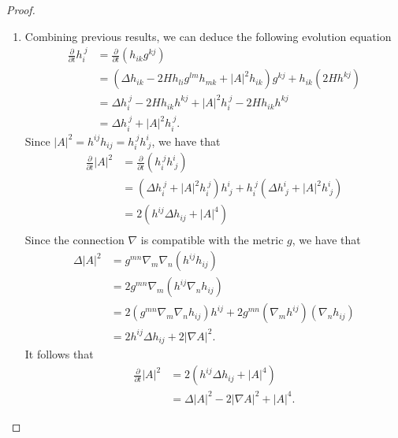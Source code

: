 \begin{proof}
\begin{enumerate}
		\item Combining previous results, we can deduce the following evolution equation \begin{equation*}
			      \begin{split}
				      \frac{\partial }{\partial t} h_{i}^{\ j}
				      &= \frac{\partial }{\partial t} (h_{ik}^{} g_{}^{kj} )\\
				      &= (\Delta h_{ik}^{} - 2 H h_{li }^{} g_{}^{lm } h_{mk}^{} + \left| A \right| ^2 h_{ik}^{})g_{}^{kj}+ h_{ik}^{} (2H h_{}^{kj} )\\
				      &= \Delta h_{i}^{\ j} - 2H h_{ik}^{} h_{}^{kj} + \left| A \right| ^2 h_{i}^{\ j} - 2H h_{ik}^{} h_{}^{kj}\\
				      &= \Delta h_{i}^{\ j} + \left| A \right| ^2 h_{i}^{\ j}.
			      \end{split}
		      \end{equation*}
		      Since $\left| A \right| ^2=h_{}^{ij} h_{ij}^{} = h_{i}^{\ j} h_{\ j}^{i}$, we have that
		      \begin{equation*}
			      \begin{split}
				      \frac{\partial }{\partial t} \left| A \right| ^2
				      &= \frac{\partial }{\partial t}  (h_{i}^{\ j} h_{\ j}^{i}) \\
				      &= (\Delta h_{i}^{\ j} + \left| A \right| ^2 h_{i}^{\ j})h_{\ j}^{i} + h_{i}^{\ j}(\Delta h_{\ j}^{i} + \left| A \right| ^2 h_{\ j}^{i})\\
				      &= 2(h_{}^{ij} \Delta h_{ij}^{} + \left| A \right| ^4)\\
			      \end{split}
		      \end{equation*}
		      Since the connection $\nabla $ is compatible with the metric $g$, we have that
		      \begin{equation*}
			      \begin{split}
				      \Delta \left| A \right| ^2
				      &= g_{}^{mn } \nabla_{m}\nabla_{n} (h_{}^{ij} h_{ij}^{})  \\
				      &= 2g_{}^{mn } \nabla_{m} (h_{}^{ij} \nabla_{n}h_{ij}^{})  \\
				      &= 2(g_{}^{mn } \nabla_{m}\nabla_{n}h_{ij}^{}) h_{}^{ij} + 2g_{}^{mn } (\nabla_{m} h_{}^{ij}) (\nabla_{n}h_{ij}^{}) \\
				      &= 2 h_{}^{ij} \Delta h_{ij}^{} + 2 \left| \nabla A \right| ^2.
			      \end{split}
		      \end{equation*}
		      It follows that
		      \begin{equation*}
			      \begin{split}
				      \frac{\partial }{\partial t} \left| A \right| ^2
				      &= 2(h_{}^{ij} \Delta h_{ij}^{} + \left| A \right| ^4)\\
				      &= \Delta \left| A \right| ^2 - 2 \left| \nabla A \right| ^2 + \left| A \right| ^4.
			      \end{split}
		      \end{equation*}
	\end{enumerate}
\end{proof}
